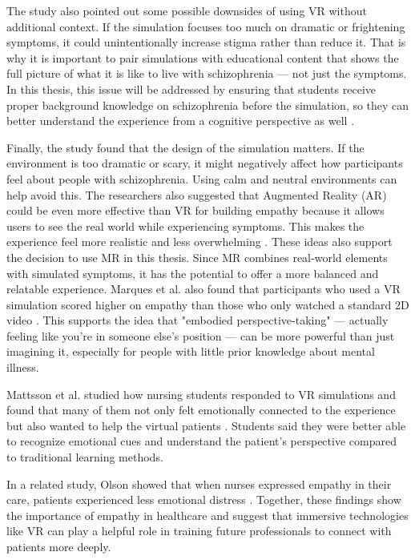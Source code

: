 The study also pointed out some possible downsides of using VR without additional context. If the simulation focuses too much on dramatic or frightening symptoms, it could unintentionally increase stigma rather than reduce it. That is why it is important to pair simulations with educational content that shows the full picture of what it is like to live with schizophrenia — not just the symptoms. In this thesis, this issue will be addressed by ensuring that students receive proper background knowledge on schizophrenia before the simulation, so they can better understand the experience from a cognitive perspective as well \cite{Zare-Bidaki2022}.

Finally, the study found that the design of the simulation matters. If the environment is too dramatic or scary, it might negatively affect how participants feel about people with schizophrenia. Using calm and neutral environments can help avoid this. The researchers also suggested that Augmented Reality (AR) could be even more effective than VR for building empathy because it allows users to see the real world while experiencing symptoms. This makes the experience feel more realistic and less overwhelming \cite{Zare-Bidaki2022}. These ideas also support the decision to use MR in this thesis. Since MR combines real-world elements with simulated symptoms, it has the potential to offer a more balanced and relatable experience.
Marques et al. also found that participants who used a VR simulation scored higher on empathy than those who only watched a standard 2D video \cite{Marques2022}. This supports the idea that "embodied perspective-taking" — actually feeling like you're in someone else’s position — can be more powerful than just imagining it, especially for people with little prior knowledge about mental illness.

Mattsson et al. studied how nursing students responded to VR simulations and found that many of them not only felt emotionally connected to the experience but also wanted to help the virtual patients \cite{Mattsson2024}. Students said they were better able to recognize emotional cues and understand the patient’s perspective compared to traditional learning methods.

In a related study, Olson showed that when nurses expressed empathy in their care, patients experienced less emotional distress \cite{Olson1995}. Together, these findings show the importance of empathy in healthcare and suggest that immersive technologies like VR can play a helpful role in training future professionals to connect with patients more deeply.


